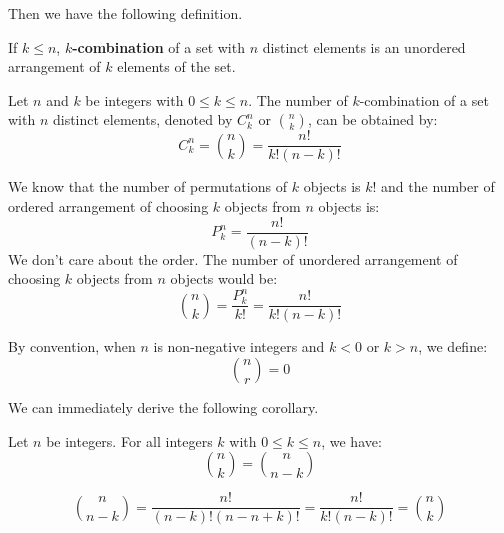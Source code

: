\documentclass{huhtakm-template-book}
\begin{document}
Then we have the following definition.
\begin{defn}
	If $k\leq n$, \textbf{$k$-combination} of a set with $n$ distinct elements is an unordered arrangement of $k$ elements of the set.
\end{defn}
\begin{thm}
	Let $n$ and $k$ be integers with $0\leq k\leq n$. The number of $k$-combination of a set with $n$ distinct elements, denoted by $C_{k}^{n}$ or $\binom{n}{k}$, can be obtained by:
	\begin{equation*}
		C_{k}^{n}=\binom{n}{k}=\frac{n!}{k!(n-k)!}
	\end{equation*}
\end{thm}
\begin{proofing}
	We know that the number of permutations of $k$ objects is $k!$ and the number of ordered arrangement of choosing $k$ objects from $n$ objects is:
	\begin{equation*}
		P_{k}^{n}=\frac{n!}{(n-k)!}
	\end{equation*}
	We don't care about the order. The number of unordered arrangement of choosing $k$ objects from $n$ objects would be:
	\begin{equation*}
		\binom{n}{k}=\frac{P_{k}^{n}}{k!}=\frac{n!}{k!(n-k)!}
	\end{equation*}
\end{proofing}
\begin{rem}
	By convention, when $n$ is non-negative integers and $k<0$ or $k>n$, we define:
	\begin{equation*}
		\binom{n}{r}=0
	\end{equation*}
\end{rem}
We can immediately derive the following corollary.
\begin{cor}
	Let $n$ be integers. For all integers $k$ with $0\leq k\leq n$, we have:
	\begin{equation*}
		\binom{n}{k}=\binom{n}{n-k}
	\end{equation*}
\end{cor}
\begin{proofing}
	\begin{equation*}
		\binom{n}{n-k}=\frac{n!}{(n-k)!(n-n+k)!}=\frac{n!}{k!(n-k)!}=\binom{n}{k}
	\end{equation*}
\end{proofing}
\end{document}
